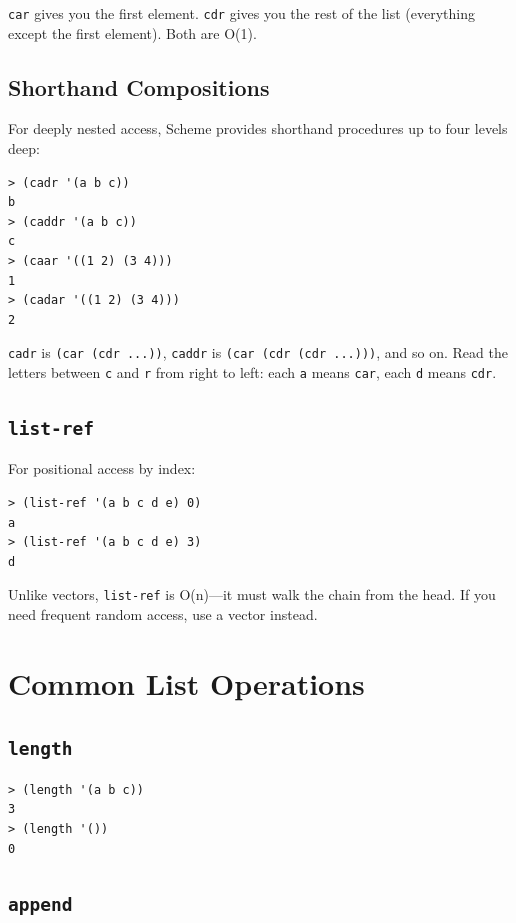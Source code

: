\texttt{car} gives you the first element. \texttt{cdr} gives you the rest of the list (everything except the first element). Both are O(1).

\subsection{Shorthand Compositions}

For deeply nested access, Scheme provides shorthand procedures up to four levels deep:

\begin{lstlisting}[style=repl]
> (cadr '(a b c))
b
> (caddr '(a b c))
c
> (caar '((1 2) (3 4)))
1
> (cadar '((1 2) (3 4)))
2
\end{lstlisting}

\texttt{cadr} is \texttt{(car (cdr ...))}, \texttt{caddr} is \texttt{(car (cdr (cdr ...)))}, and so on. Read the letters between \texttt{c} and \texttt{r} from right to left: each \texttt{a} means \texttt{car}, each \texttt{d} means \texttt{cdr}.

\subsection{\texttt{list-ref}}

For positional access by index:

\begin{lstlisting}[style=repl]
> (list-ref '(a b c d e) 0)
a
> (list-ref '(a b c d e) 3)
d
\end{lstlisting}

Unlike vectors, \texttt{list-ref} is O(n)---it must walk the chain from the head. If you need frequent random access, use a vector instead.

\section{Common List Operations}

\subsection{\texttt{length}}

\begin{lstlisting}[style=repl]
> (length '(a b c))
3
> (length '())
0
\end{lstlisting}

\subsection{\texttt{append}}

